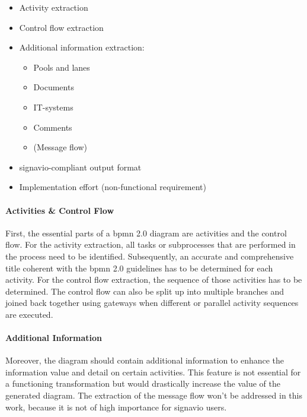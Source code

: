 \begin{itemize}
    \item Activity extraction
    \item Control flow extraction
    \item Additional information extraction:
          \begin{itemize}
              \item Pools and lanes
              \item Documents
              \item IT-systems
              \item Comments
              \item (Message flow)
          \end{itemize}
    \item \gls{signavio}-compliant output format
    \item Implementation effort (non-functional requirement)
\end{itemize}

\paragraph{Activities \& Control Flow}
First, the essential parts of a \acs{bpmn} 2.0 diagram are activities and the control flow. For the activity extraction, all tasks or subprocesses that are performed in the process need to be identified. Subsequently, an accurate and comprehensive title coherent with the \acs{bpmn} 2.0 guidelines \citep{omg2011bpmn} has to be determined for each activity. For the control flow extraction, the sequence of those activities has to be determined. The control flow can also be split up into multiple branches and joined back together using gateways when different or parallel activity sequences are executed.


\paragraph{Additional Information}\label{par:add-info}
Moreover, the diagram should contain additional information to enhance the information value and detail on certain activities. This feature is not essential for a functioning transformation but would drastically increase the value of the generated diagram. The extraction of the message flow won't be addressed in this work, because it is not of high importance for \gls{signavio} users.

